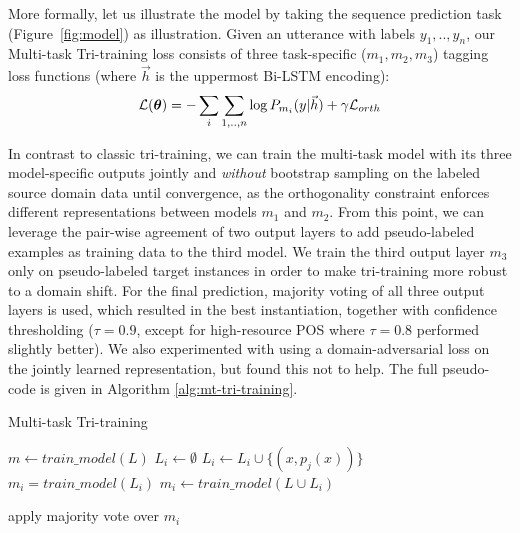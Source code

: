 \documentclass[11pt,a4paper]{article}
\begin{document}
More formally, let us illustrate the model by taking the sequence prediction task (Figure~\ref{fig:model}) as illustration. Given an utterance with labels $y_1,..,y_n$, our Multi-task Tri-training loss consists of three task-specific ($m_1,m_2,m_3$) tagging loss functions (where $\vec{h}$ is the uppermost Bi-LSTM encoding): \begin{align}
{\cal L}({\boldsymbol \theta}) = - \sum_i \sum_{1,..,n} \log P_{m_i}(y|\vec{h}) + \gamma {\cal L}_{orth}
\end{align}

In contrast to classic tri-training, we can train the multi-task model with its three model-specific outputs jointly and \textit{without} bootstrap sampling on the labeled source domain data until convergence, as the orthogonality constraint enforces different representations between models $m_1$ and $m_2$. From this point, we can leverage the pair-wise agreement of two output layers to add pseudo-labeled examples as training data to the third model. We train the third output layer $m_3$ only on pseudo-labeled target instances in order to make tri-training more robust to a domain shift. For the final prediction, majority voting of all three output layers is used, which resulted in the best instantiation, together with confidence thresholding  ($\tau = 0.9$, except for high-resource POS where $\tau =0.8$ performed slightly better). We also experimented with using a domain-adversarial loss \cite{Ganin2016} on the jointly learned representation, but found this not to help. The full pseudo-code is given in Algorithm \ref{alg:mt-tri-training}. 

\begin{algorithm}[t!]
\caption{Multi-task Tri-training}\label{alg:mt-tri-training}
\begin{algorithmic}[1]
\State $m \gets train\_model(L)$
\Repeat
        \State $L_i \gets \emptyset$
            	\State $L_i \gets L_i \cup \{(x, p_j(x))\}$
            \EndIf
        \EndFor
        	$m_i = train\_model(L_i)$
        \Else
        	{$m_i \gets train\_model(L \cup L_i)$}
        \EndIf
        
	\EndFor
{}
\State apply majority vote over $m_i$
\end{algorithmic}
\end{algorithm}
\end{document}
